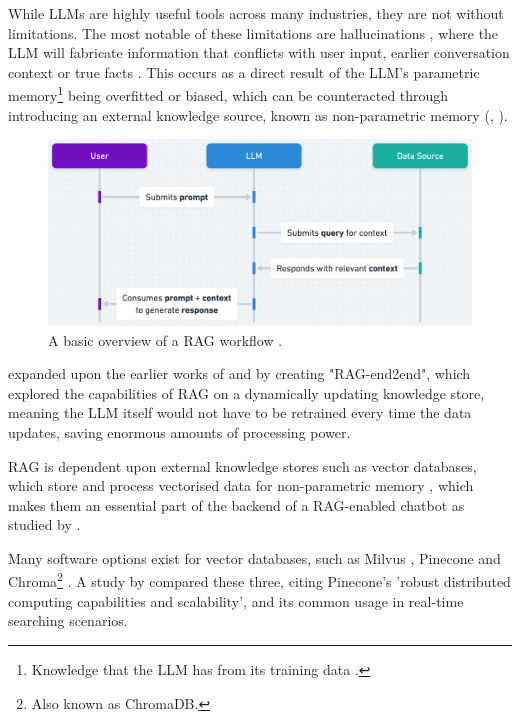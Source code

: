 \documentclass[12pt]{report}
\begin{document}
    While LLMs are highly useful tools across many industries, they are not without limitations. The most notable 
    of these limitations are hallucinations \autocite{lewis_retrieval-augmented_2021}, where the LLM will fabricate 
    information that conflicts with user input, earlier conversation context or true facts \autocite{zhang_sirens_2023}. This occurs as a direct result of the LLM's parametric memory\footnote{Knowledge that the LLM has from its training data \autocite{siriwardhana_improving_2023}.}
    being overfitted or biased, which can be counteracted through introducing an external knowledge source, known as non-parametric memory (\textcite{komeili_internet-augmented_2022}, \textcite{siriwardhana_improving_2023}).
    
    \begin{figure}[H] 
        \centering
        \includegraphics[width=.8\linewidth]{RAGProcess.png}
        \caption{A basic overview of a RAG workflow \autocite{openai_retrieval_nodate}.}
        \label{fig:RAGProcess}
    \end{figure}

    \textcite{siriwardhana_improving_2023} expanded upon the earlier works of \textcite{karpukhin_dense_2020} and \textcite{lewis_pre-training_2020} by creating 
    "RAG-end2end", which explored the capabilities of RAG on a dynamically updating knowledge store, meaning the LLM itself would not have to be retrained 
    every time the data updates, saving enormous amounts of processing power.
    
    RAG is dependent upon external knowledge stores such as vector databases, which store and process vectorised data
    for non-parametric memory \autocite{li_modernization_2023}, which makes them an essential part of the backend of 
    a RAG-enabled chatbot as studied by \textcite{odede_jaybot_2024}. 
    
    Many software options exist for
    vector databases, such as Milvus \autocite{wang_milvus_2021}, Pinecone \autocite{pinecone_pinecone_nodate} and Chroma\footnote{Also known as ChromaDB.} \autocite{chroma_chroma_nodate}.
    A study by \textcite{xie_brief_2023} compared these three, citing Pinecone's 'robust distributed computing capabilities and scalability', and its common usage 
    in real-time searching scenarios.
    
\end{document}
